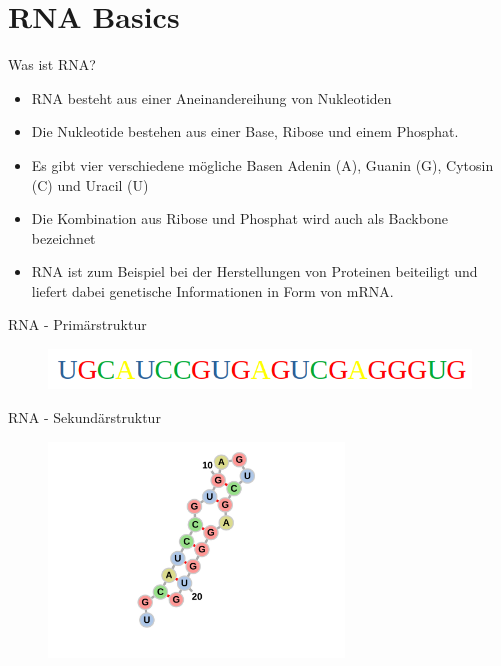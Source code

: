 \section{RNA Basics}
\begin{frame}{Was ist RNA?}
	\begin{itemize}
			\item RNA besteht aus einer Aneinandereihung von Nukleotiden
			\item Die Nukleotide bestehen aus einer Base, Ribose und einem Phosphat.
			\item Es gibt vier verschiedene mögliche Basen Adenin (A), Guanin (G), Cytosin (C) und Uracil (U)
			\item Die Kombination aus Ribose und Phosphat wird auch als Backbone bezeichnet
			\item RNA ist zum Beispiel bei der Herstellungen von Proteinen beiteiligt und liefert dabei genetische Informationen in Form von mRNA.
	\end{itemize}
\end{frame}

\begin{frame}{RNA - Primärstruktur}
\vspace*{\fill}
\begin{figure}
	\includegraphics[width=1\textwidth]{imgs/pst.png}
\end{figure}	
\vspace*{\fill}
\end{frame}

\begin{frame}{RNA - Sekundärstruktur}
\vspace*{\fill}
\begin{figure}
	\includegraphics[width=0.7\textwidth]{imgs/sst.png}
\end{figure}	
\vspace*{\fill}
\end{frame}

